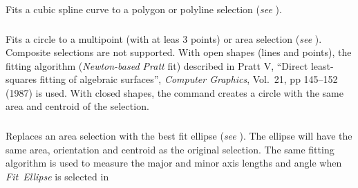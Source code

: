 Fits a cubic spline curve to a polygon or
polyline selection (\emph{see} ). 




\subsubsection{\protect{}\label{sub:Fit-Circle}}

Fits a circle
to a multipoint (with at leas 3 points) or area selection \cite{C-FitCircle}
(\emph{see} ). Composite selections
are not supported. With open shapes (lines and points), the fitting
algorithm (\emph{Newton-based Pratt} fit) described in Pratt V, ``Direct
least-squares fitting of algebraic surfaces'', \emph{Computer Graphics},
Vol.\ 21, pp 145--152 (1987) is used. With closed shapes, the command
creates a circle with the same area and centroid of the selection.


\subsubsection[\protect\userinterface{Fit Ellipse}]{\protect{}\label{sub:Fit-Ellipse}\improvement{}}

Replaces an area selection with the best fit ellipse
(\emph{see} ). The ellipse will have
the same area, orientation and centroid as the original selection.
The same fitting algorithm is used to measure the major and minor
axis lengths and angle when \emph{Fit~Ellipse} is selected in {\small {}}{\small \par}




\subsubsection[\protect\userinterface{Interpolate}]{\protect{}\label{sub:Interpolate}}

